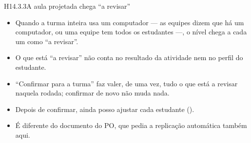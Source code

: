\begin{historia}{H14.3.3}{A aula projetada chega \enquote{a revisar}}{\parcial}
\aceite
\begin{itemize}
  \item Quando a turma inteira usa um computador --- as equipes dizem que há um
    computador, ou uma equipe tem todos os estudantes ---, o nível chega a cada
    um como \enquote{a revisar}.
  \item O que está \enquote{a revisar} não conta no resultado da atividade nem
    no perfil do estudante.
  \item \enquote{Confirmar para a turma} faz valer, de uma vez, tudo o que está
    a revisar naquela rodada; confirmar de novo não muda nada.
  \item Depois de confirmar, ainda posso ajustar cada estudante ().
  \item É diferente do documento do PO, que pedia a replicação automática
    também aqui.
\end{itemize}
\end{historia}


